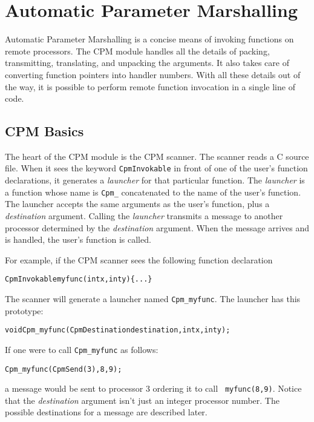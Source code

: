 \chapter{Automatic Parameter Marshalling}

Automatic Parameter Marshalling is a concise means of invoking
functions on remote processors.  The CPM module handles all the
details of packing, transmitting, translating, and unpacking the
arguments.  It also takes care of converting function pointers into
handler numbers.  With all these details out of the way, it is
possible to perform remote function invocation in a single line of
code.

\section{CPM Basics}

The heart of the CPM module is the CPM scanner.  The scanner reads a C
source file.  When it sees the keyword {\tt CpmInvokable} in front of
one of the user's function declarations, it generates a {\it launcher}
for that particular function.  The {\it launcher} is a function whose
name is {\tt Cpm\_} concatenated to the name of the user's function.
The launcher accepts the same arguments as the user's function, plus a
{\it destination} argument.  Calling the {\it launcher} transmits a
message to another processor determined by the {\it destination}
argument.  When the message arrives and is handled, the user's
function is called.

For example, if the CPM scanner sees the following function
declaration

\begin{alltt}
    CpmInvokable myfunc(int x, int y) \{ ... \}
\end{alltt}

The scanner will generate a launcher named {\tt Cpm\_myfunc}.
The launcher has this prototype:

\begin{alltt}
    void Cpm_myfunc(CpmDestination destination, int x, int y);
\end{alltt}

If one were to call {\tt Cpm\_myfunc} as follows:

\begin{alltt}
    Cpm_myfunc(CpmSend(3), 8, 9);
\end{alltt}

a message would be sent to processor 3 ordering it to call {\tt
myfunc(8,9)}.  Notice that the {\it destination} argument isn't just an
integer processor number.  The possible destinations for a message are
described later.

